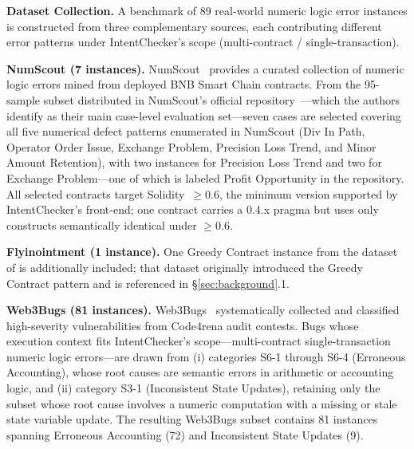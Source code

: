 \documentclass[pdflatex,sn-basic]{sn-jnl}%
\theoremstyle{thmstyleone}%
\theoremstyle{thmstyletwo}%
\theoremstyle{thmstylethree}%
\begin{document}
\smallskip
\noindent\textbf{Dataset Collection.}
A benchmark of 89 real-world numeric logic error instances is constructed from three complementary sources, each contributing different error patterns under IntentChecker's scope (multi-contract / single-transaction).

\smallskip\noindent\textbf{NumScout (7 instances).}
NumScout~\citep{numscout} provides a curated collection of numeric logic errors mined from deployed BNB Smart Chain contracts.
From the 95-sample subset distributed in NumScout's official repository~\citep{numscout_dataset}---which the authors identify as their main case-level evaluation set---seven cases are selected covering all five numerical defect patterns enumerated in NumScout (Div In Path, Operator Order Issue, Exchange Problem, Precision Loss Trend, and Minor Amount Retention), with two instances for Precision Loss Trend and two for Exchange Problem---one of which is labeled Profit Opportunity in the repository.
All selected contracts target Solidity~$\geq$0.6, the minimum version supported by IntentChecker's front-end; one contract carries a 0.4.x pragma but uses only constructs semantically identical under $\geq$0.6.

\smallskip\noindent\textbf{Flyinointment (1 instance).}
One Greedy Contract instance from the dataset of \citet{flyinointment} is additionally included; that dataset originally introduced the Greedy Contract pattern and is referenced in §\ref{sec:background}.1.

\smallskip\noindent\textbf{Web3Bugs (81 instances).}
Web3Bugs~\citep{exploitablebugs} systematically collected and classified high-severity vulnerabilities from Code4rena audit contests.
Bugs whose execution context fits IntentChecker's scope---multi-contract single-transaction numeric logic errors---are drawn from (i) categories S6-1 through S6-4 (Erroneous Accounting), whose root causes are semantic errors in arithmetic or accounting logic, and (ii) category S3-1 (Inconsistent State Updates), retaining only the subset whose root cause involves a numeric computation with a missing or stale state variable update.
The resulting Web3Bugs subset contains 81 instances spanning Erroneous Accounting (72) and Inconsistent State Updates (9).
\end{document}
